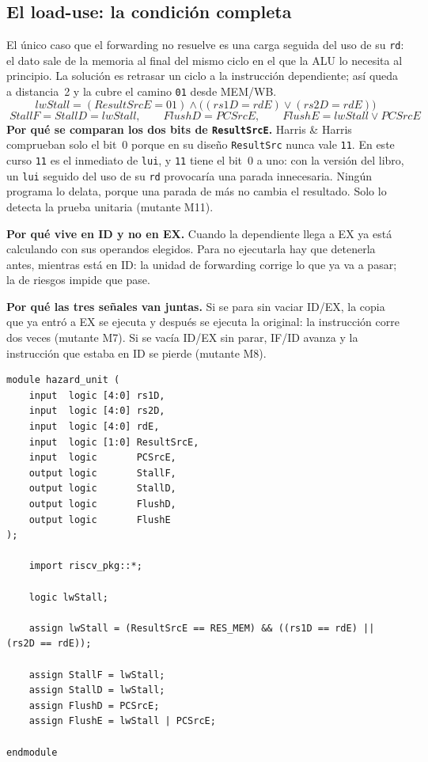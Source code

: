 \documentclass[11pt,letterpaper]{article}
\newcommand{\cod}[1]{\texttt{#1}}
\begin{document}
\subsection{El load-use: la condici\'on completa}
El \'unico caso que el forwarding no resuelve es una carga seguida del uso de su \cod{rd}: el dato sale
de la memoria al final del mismo ciclo en el que la ALU lo necesita al principio. La soluci\'on es
retrasar un ciclo a la instrucci\'on dependiente; as\'i queda a distancia~2 y la cubre el camino
\cod{01} desde MEM/WB.
\[
\boxed{\;\mathit{lwStall} = (\mathit{ResultSrcE} = 01) \wedge \bigl((\mathit{rs1D} = \mathit{rdE})
\vee (\mathit{rs2D} = \mathit{rdE})\bigr)\;}
\]
\[
\boxed{\;\mathit{StallF} = \mathit{StallD} = \mathit{lwStall},\qquad
\mathit{FlushD} = \mathit{PCSrcE},\qquad
\mathit{FlushE} = \mathit{lwStall} \vee \mathit{PCSrcE}\;}
\]
\textbf{Por qu\'e se comparan los dos bits de \cod{ResultSrcE}.} Harris \& Harris comprueban solo el
bit~0 porque en su dise\~no \cod{ResultSrc} nunca vale \cod{11}. En este curso \cod{11} es el
inmediato de \cod{lui}, y \cod{11} tiene el bit~0 a uno: con la versi\'on del libro, un \cod{lui}
seguido del uso de su \cod{rd} provocar\'ia una parada innecesaria. Ning\'un programa lo delata, porque
una parada de m\'as no cambia el resultado. Solo lo detecta la prueba unitaria (mutante M11).

\textbf{Por qu\'e vive en ID y no en EX.} Cuando la dependiente llega a EX ya est\'a calculando con sus
operandos elegidos. Para no ejecutarla hay que detenerla antes, mientras est\'a en ID: la unidad de
forwarding corrige lo que ya va a pasar; la de riesgos impide que pase.

\textbf{Por qu\'e las tres se\~nales van juntas.} Si se para sin vaciar ID/EX, la copia que ya entr\'o a
EX se ejecuta y despu\'es se ejecuta la original: la instrucci\'on corre dos veces (mutante M7). Si se
vac\'ia ID/EX sin parar, IF/ID avanza y la instrucci\'on que estaba en ID se pierde (mutante M8).

\begin{lstlisting}[language=SV,title={\small\ttfamily rtl/hazard\_unit.sv}]
module hazard_unit (
    input  logic [4:0] rs1D,
    input  logic [4:0] rs2D,
    input  logic [4:0] rdE,
    input  logic [1:0] ResultSrcE,
    input  logic       PCSrcE,
    output logic       StallF,
    output logic       StallD,
    output logic       FlushD,
    output logic       FlushE
);

    import riscv_pkg::*;

    logic lwStall;

    assign lwStall = (ResultSrcE == RES_MEM) && ((rs1D == rdE) || (rs2D == rdE));

    assign StallF = lwStall;
    assign StallD = lwStall;
    assign FlushD = PCSrcE;
    assign FlushE = lwStall | PCSrcE;

endmodule
\end{lstlisting}
\end{document}
